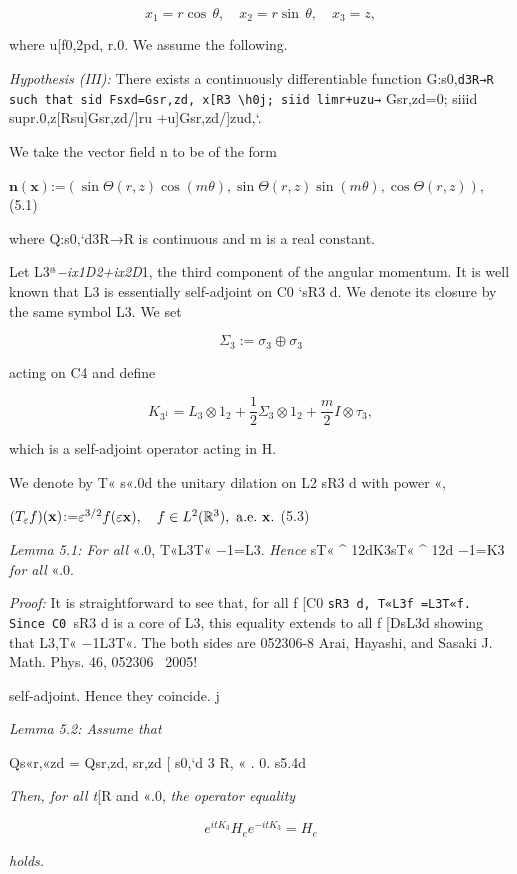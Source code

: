 \documentclass{article}
\begin{document}
$$x_{1}=r\cos\,\theta,\quad x_{2}=r\sin\,\theta,\quad x_{3}=z,$$

where u[f0,2pd, r.0. We assume the following.

\textit{Hypothesis (III):} There exists a continuously differentiable function G:s0,\verb|d3R→R such that sid Fsxd=Gsr,zd, x[R3 \h0j; siid limr+uzu→| Gsr,zd=0; siiid supr.0,z[Rsu]Gsr,zd/]ru +u]Gsr,zd/]zud,`.

We take the vector field n to be of the form

$\mathbf{n(x)}$:=$(\sin\Theta(r,z)\cos(m\theta),\sin\Theta(r,z)\sin(m\theta),\cos\Theta(r,z))$, (5.1)

where Q:s0,`d3R→R is continuous and m is a real constant.

Let L3ª\textit{−ix1D2+ix2D}1, the third component of the angular momentum. It is well known that L3 is essentially self-adjoint on C0 `sR3 d. We denote its closure by the same symbol L3. We set

$$\Sigma_{3}{:=}\sigma_{3}\oplus\sigma_{3}$$

acting on C4 and define

$$K_{3^{1}}{=}L_{3}\otimes1_{2}+\frac{1}{2}\Sigma_{3}\otimes1_{2}+\frac{m}{2}I\otimes\tau_{3},\tag{5.2}$$

which is a self-adjoint operator acting in H.

We denote by T« s«.0d the unitary dilation on L2 sR3 d with power «,

$(T_{\varepsilon}f)({\bf x})$:=$\varepsilon^{3/2}f(\varepsilon{\bf x}),\quad f\in L^{2}({\mathbb{R}}^{3}),\ {\rm a.e.}\ {\bf x}.$ (5.3)

\textit{Lemma 5.1: For all} «.0, T«L3T« −1=L3. \textit{Hence} sT« ^ 12dK3sT« ^ 12d −1=K3 \textit{for all} «.0.

\textit{Proof:} It is straightforward to see that, for all f [C0 \verb|sR3 d, T«L3f =L3T«f. Since C0 |sR3 d is a core of L3, this equality extends to all f [DsL3d showing that L3,T« −1L3T«. The both sides are 052306-8 Arai, Hayashi, and Sasaki J. Math. Phys. 46, 052306 ~2005!

self-adjoint. Hence they coincide. j

\textit{Lemma 5.2: Assume that}

Qs«r,«zd = Qsr,zd, sr,zd [ s0,`d 3 R, « . 0. s5.4d

\textit{Then, for all t}[R and «.0, \textit{the operator equality}

$$e^{itK_{3}}H_{e}e^{-itK_{3}}=H_{e}\tag{5.5}$$

\textit{holds.}
\end{document}

